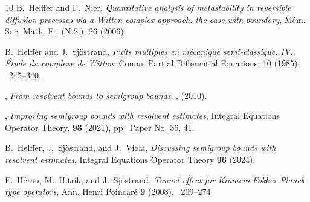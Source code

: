 \documentclass[12pt]{amsart}
\numberwithin{equation}{section}
\numberwithin{figure}{section}
\begin{document}
\begin{thebibliography}{10}
{\sc B.~Helffer and F.~Nier}, {\em Quantitative analysis of metastability in reversible diffusion processes via a {W}itten complex approach: the case with boundary}, M\'em. Soc. Math. Fr. (N.S.), 26 (2006).

{\sc B.~Helffer and J.~Sj\"ostrand}, {\em Puits multiples en m\'ecanique semi-classique. {IV}. \'{E}tude du complexe de {W}itten}, Comm. Partial Differential Equations, 10 %
(1985), ~245--340.

\bysame, {\em From resolvent %
bounds to semigroup %
bounds}, ,  (2010).

\bysame, {\em Improving semigroup %
bounds with resolvent estimates}, Integral Equations Operator %
Theory, \textbf{93} (2021), %
pp.~Paper No. 36, 41.

{\sc B.~Helffer, J.~Sj\"ostrand, and J.~Viola}, {\em Discussing semigroup bounds with resolvent estimates}, Integral Equations %
Operator Theory \textbf{96}  (2024). %

{\sc F.~H\'erau, M.~Hitrik, and J.~Sj\"ostrand}, {\em Tunnel effect for {K}ramers-{F}okker-{P}lanck type operators}, Ann. Henri %
Poincar\'e \textbf{9}  (2008), ~209--274. %


\end{thebibliography}
\end{document}
